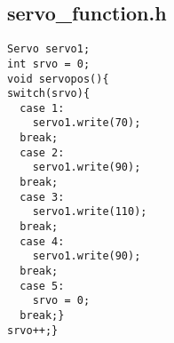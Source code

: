 \subsection{servo\_function.h}
\begin{lstlisting}
Servo servo1;
int srvo = 0;
void servopos(){
switch(srvo){
  case 1:
    servo1.write(70);
  break;
  case 2:
    servo1.write(90);
  break;
  case 3:
    servo1.write(110);
  break;
  case 4:
    servo1.write(90);
  break;
  case 5:
    srvo = 0;
  break;}
srvo++;}
\end{lstlisting}